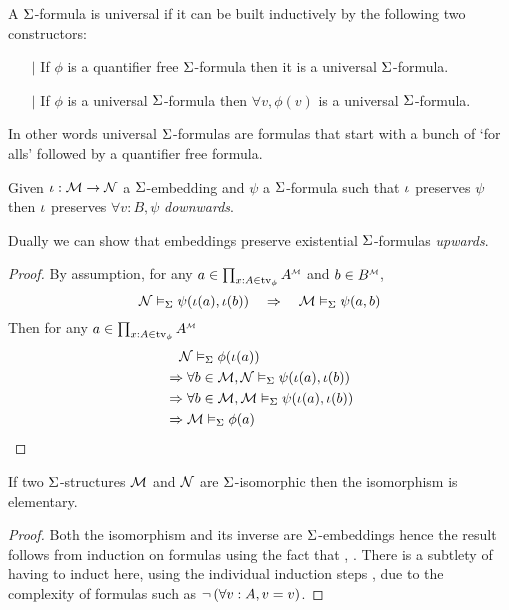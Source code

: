 \begin{dfn}
    A $\Sigma$-formula is universal if it can be 
    built inductively by the following two constructors:
    \begin{itemize}
        \item[$\vert$] If $\phi$ is a quantifier free $\Sigma$-formula 
        then it is a universal $\Sigma$-formula.
        \item[$\vert$] If $\phi$ is a universal $\Sigma$-formula then
        $\forall v, \phi(v)$ is a universal $\Sigma$-formula.
    \end{itemize}
    In other words universal $\Sigma$-formulas are formulas that start with 
    a bunch of `for alls' followed by a quantifier free formula.
\end{dfn}

\begin{prop}
    Given $\iota : \mathcal{M} \to \mathcal{N}$ a $\Sigma$-embedding and
    $\psi$ a $\Sigma$-formula such that
    $\iota$ preserves $\psi$ then
    $\iota$ preserves $\forall v : B, \psi$ \textit{downwards}.

    Dually we can show that embeddings
    preserve existential $\Sigma$-formulas \textit{upwards}.
\end{prop}
\begin{proof}
    By assumption, for any $a \in \prod_{x : A \in \tv{\phi}} \mmintp{A}$ and 
    $b \in \mmintp{B}$,
    \[\mathcal{N} \vDash_{\Sigma} \psi(\iota(a),\iota(b)) \quad \Rightarrow \quad
    \mathcal{M} \vDash_{\Sigma} \psi(a,b)\]
    Then for any $a \in \prod_{x : A \in \tv{\phi}} \mmintp{A}$
    \begin{align*}
        &\quad \mathcal{N} \vDash_{\Sigma} \phi(\iota(a))\\
        &\Rightarrow \forall b \in {\mathcal{M}}, 
        \mathcal{N} \vDash_{\Sigma} \psi(\iota(a),\iota(b)) \\
        &\Rightarrow \forall b \in {\mathcal{M}}, 
        \mathcal{M} \vDash_{\Sigma} \psi(\iota(a),\iota(b))\\
        &\Rightarrow \mathcal{M} \vDash_{\Sigma} \phi(a)
    \end{align*}
\end{proof}

\begin{prop}
    If two $\Sigma$-structures $\mathcal{M}$ and $\mathcal{N}$ 
    are $\Sigma$-isomorphic then the isomorphism is elementary.
\end{prop}
\begin{proof}
    Both the isomorphism and its inverse are $\Sigma$-embeddings
    hence the result follows from induction on formulas using the fact that
    ,
    .
    There is a subtlety of having to induct here, using the individual 
    induction steps , 
    due to the complexity of formulas such as $\neg\, (\forall v : A, v = v)$.
\end{proof}


